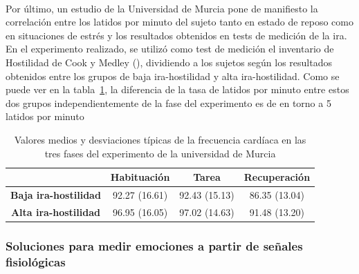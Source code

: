\paragraph{}
Por último, un estudio de la Universidad de Murcia \citep{breva2000ira} pone de manifiesto la correlación entre los latidos por minuto del sujeto tanto en estado de reposo como en situaciones de estrés y los resultados obtenidos en tests de medición de la ira. En el experimento realizado, se utilizó como test de medición el inventario de Hostilidad de Cook y Medley (\citeyear{cook1954proposed}), dividiendo a los sujetos según los resultados obtenidos entre los grupos de baja ira-hostilidad y alta ira-hostilidad. Como se puede ver en la tabla~\ref{tab:frecCard}, la diferencia de la tasa de latidos por minuto entre estos dos grupos independientemente de la fase del experimento es de en torno a 5 latidos por minuto

\begin{table}[h]
\centering
\caption{Valores medios y desviaciones típicas de la frecuencia cardíaca en las tres fases del experimento de la universidad de Murcia}
\label{tab:frecCard}
\begin{tabular}{c|c|c|c|}
\cline{2-4}
                                                   & \textbf{Habituación} & \textbf{Tarea} & \textbf{Recuperación} \\ \hline
\multicolumn{1}{|c|}{\textbf{Baja ira-hostilidad}} & 92.27 (16.61)        & 92.43 (15.13)  & 86.35 (13.04)         \\ \hline
\multicolumn{1}{|c|}{\textbf{Alta ira-hostilidad}} & 96.95 (16.05)        & 97.02 (14.63)  & 91.48 (13.20)         \\ \hline
\end{tabular}
\end{table}


\subsubsection{Soluciones para medir emociones a partir de señales fisiológicas}
\label{subsubsection:medirEmocFisio}

